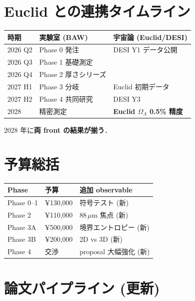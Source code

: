 \documentclass[11pt,a4paper]{article}
\begin{document}
\section{Euclid との連携タイムライン}

\begin{center}
\begin{tabular}{lll}
\toprule
時期 & 実験室 (BAW) & 宇宙論 (Euclid/DESI) \\
\midrule
2026 Q2 & Phase 0 発注 & DESI Y1 データ公開 \\
2026 Q3 & Phase 1 基礎測定 & \\
2026 Q4 & Phase 2 厚さシリーズ & \\
2027 H1 & Phase 3 分岐 & Euclid 初期データ \\
2027 H2 & Phase 4 共同研究 & DESI Y3 \\
2028 & 精密測定 & \textbf{Euclid $\Omega_\Lambda$ 0.5\% 精度} \\
\bottomrule
\end{tabular}
\end{center}

2028 年に\textbf{両 front の結果が揃う}．

\section{予算総括}

\begin{center}
\begin{tabular}{lll}
\toprule
Phase & 予算 & 追加 observable \\
\midrule
Phase 0--1 & ¥130,000 & 符号テスト (新) \\
Phase 2 & ¥110,000 & 88\,$\mu$m 焦点 (新) \\
Phase 3A & ¥500,000 & 境界エントロピー (新) \\
Phase 3B & ¥200,000 & 2D vs 3D (新) \\
Phase 4 & 交渉 & proposal 大幅強化 (新) \\
\bottomrule
\end{tabular}
\end{center}

\section{論文パイプライン (更新)}
\end{document}
